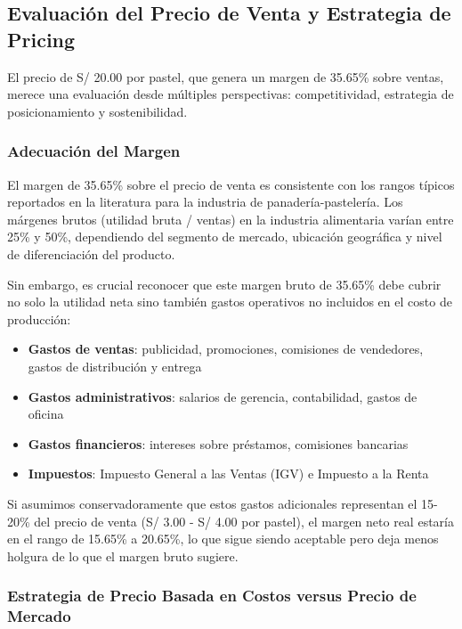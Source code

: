 \documentclass[
  stu,
  floatsintext,
  longtable,
  a4paper,
  nolmodern,
  notxfonts,
  notimes,
  12pt,
  colorlinks=true,linkcolor=blue,citecolor=blue,urlcolor=blue]{apa7}
\providecommand{\tightlist}{%
  \setlength{\itemsep}{0pt}\setlength{\parskip}{0pt}}
\begin{document}
\subsection{Evaluación del Precio de Venta y Estrategia de
Pricing}\label{evaluaciuxf3n-del-precio-de-venta-y-estrategia-de-pricing}

El precio de S/ 20.00 por pastel, que genera un margen de 35.65\% sobre
ventas, merece una evaluación desde múltiples perspectivas:
competitividad, estrategia de posicionamiento y sostenibilidad.

\subsubsection{Adecuación del Margen}\label{adecuaciuxf3n-del-margen}

El margen de 35.65\% sobre el precio de venta es consistente con los
rangos típicos reportados en la literatura para la industria de
panadería-pastelería. Los márgenes brutos (utilidad bruta / ventas) en
la industria alimentaria varían entre 25\% y 50\%, dependiendo del
segmento de mercado, ubicación geográfica y nivel de diferenciación del
producto.

Sin embargo, es crucial reconocer que este margen bruto de 35.65\% debe
cubrir no solo la utilidad neta sino también gastos operativos no
incluidos en el costo de producción:

\begin{itemize}
\tightlist
\item
  \textbf{Gastos de ventas}: publicidad, promociones, comisiones de
  vendedores, gastos de distribución y entrega
\item
  \textbf{Gastos administrativos}: salarios de gerencia, contabilidad,
  gastos de oficina
\item
  \textbf{Gastos financieros}: intereses sobre préstamos, comisiones
  bancarias
\item
  \textbf{Impuestos}: Impuesto General a las Ventas (IGV) e Impuesto a
  la Renta
\end{itemize}

Si asumimos conservadoramente que estos gastos adicionales representan
el 15-20\% del precio de venta (S/ 3.00 - S/ 4.00 por pastel), el margen
neto real estaría en el rango de 15.65\% a 20.65\%, lo que sigue siendo
aceptable pero deja menos holgura de lo que el margen bruto sugiere.

\subsubsection{Estrategia de Precio Basada en Costos versus Precio de
Mercado}\label{estrategia-de-precio-basada-en-costos-versus-precio-de-mercado}
\end{document}
